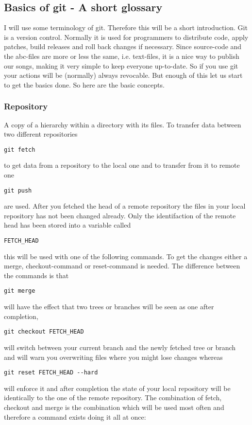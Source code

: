 \documentclass[10pt,a4paper,oneside]{article}
\begin{document}
\subsection{Basics of git - A short glossary}
I will use some terminology of git. Therefore this will be a short introduction. Git is a version control. Normally it is used for programmers to distribute code, apply patches, build releases and roll back changes if necessary. Since source-code and the abc-files are more or less the same, i.e. text-files, it is a nice way to publish our songs, making it very simple to keep everyone up-to-date. So if you use git your actions will be (normally) always revocable. But enough of this let us start to get the basics done. So here are the basic concepts.\\

\subsubsection{Repository}
A copy of a hierarchy within a directory with its files. To transfer data between two different repositories 
\begin{verbatim}
git fetch
\end{verbatim}
to get data from a repository to the local one and to transfer from it to remote one
\begin{verbatim}
git push
\end{verbatim}
are used. After you fetched the head of a remote repository the files in your local repository has not been changed already. Only the identifaction of the remote head has been stored into a variable called \begin{verbatim}
FETCH_HEAD
\end{verbatim} this will be used with one of the following commands. To get the changes either a merge, checkout-command or reset-command is needed. The difference between the commands is that
\begin{verbatim}
git merge
\end{verbatim} will have the effect that two trees or branches will be seen as one after completion, \begin{verbatim}
git checkout FETCH_HEAD
\end{verbatim} will switch between your current branch and the newly fetched tree or branch and will warn you overwriting files where you might lose changes whereas \begin{verbatim}
git reset FETCH_HEAD --hard
\end{verbatim} will enforce it and after completion the state of your local repository will be identically to the one of the remote repository. The combination of fetch, checkout and merge is the combination which will be used most often and therefore a command exists doing it all at once:
\end{document}

